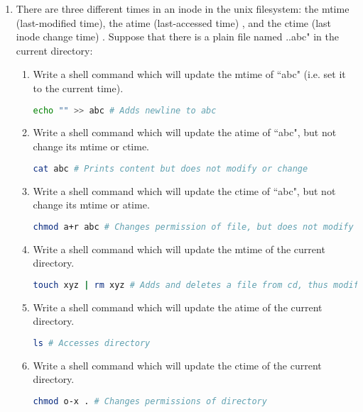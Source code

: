 \documentclass[11pt]{article}
\begin{document}
\begin{enumerate}
		\item There are three different times in an inode in the unix filesystem: the mtime (last-modified time), the atime (last-accessed time) , and the ctime (last inode change time) . Suppose that there is a plain file named ..abc" in the current directory:
			\begin{enumerate}
				\item Write a shell command which will update the mtime of ``abc" (i.e. set it to the current time).
					\begin{lstlisting}[language=sh]
echo "" >> abc # Adds newline to abc\end{lstlisting}
				\item Write a shell command which will update the atime of ``abc", but not change its mtime or ctime.
					\begin{lstlisting}[language=sh]
cat abc # Prints content but does not modify or change\end{lstlisting}
				\item Write a shell command which will update the ctime of ``abc", but not change its mtime or atime.
					\begin{lstlisting}[language=sh]
chmod a+r abc # Changes permission of file, but does not modify or access\end{lstlisting}
				\item Write a shell command which will update the mtime of the current directory.
					\begin{lstlisting}[language=sh]
touch xyz | rm xyz # Adds and deletes a file from cd, thus modifying it\end{lstlisting}
				\item Write a shell command which will update the atime of the current directory.
					\begin{lstlisting}[language=sh]
ls # Accesses directory\end{lstlisting}			
				\item Write a shell command which will update the ctime of the current directory.
					\begin{lstlisting}[language=sh]
chmod o-x . # Changes permissions of directory\end{lstlisting}
			\end{enumerate}
		

\end{enumerate}
\end{document}
